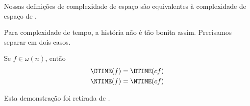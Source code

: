 \begin{ucorollary}
    Nossas definições de complexidade de espaço
    são equivalentes à complexidade de espaço
    de .
\end{ucorollary}

Para complexidade de tempo,
a história não é tão bonita assim.
Precisamos separar em dois casos.

\begin{theorem}
    Se $f \in \omega(n)$, então
    \begin{align*}
        \DTIME(f) &= \DTIME(cf) \\
        \NTIME(f) &= \NTIME(cf)
    \end{align*}
\end{theorem}

Esta demonstração foi retirada de \cite[p.~290]{HopcroftUllman1979}.

